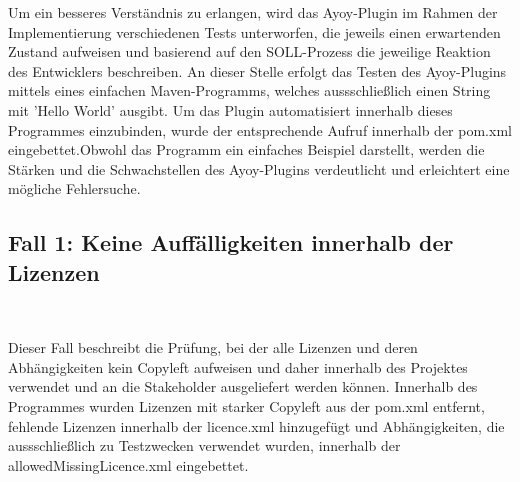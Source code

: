 Um ein besseres Verständnis zu erlangen, wird das Ayoy-Plugin im Rahmen der Implementierung verschiedenen Tests unterworfen, die jeweils einen erwartenden Zustand aufweisen und basierend auf den SOLL-Prozess die jeweilige Reaktion des Entwicklers beschreiben. An dieser Stelle erfolgt das Testen des Ayoy-Plugins mittels eines einfachen Maven-Programms, welches aussschließlich einen String mit 'Hello World' ausgibt. Um das Plugin automatisiert innerhalb dieses Programmes einzubinden, wurde der entsprechende Aufruf innerhalb der pom.xml eingebettet.Obwohl das Programm ein einfaches Beispiel darstellt, werden die Stärken und die Schwachstellen des Ayoy-Plugins verdeutlicht und erleichtert eine mögliche Fehlersuche. 

\subsection{Fall 1: Keine Auffälligkeiten innerhalb der Lizenzen}$~$

Dieser Fall beschreibt die Prüfung, bei der alle Lizenzen und deren Abhängigkeiten kein Copyleft aufweisen und daher innerhalb des Projektes verwendet und an die Stakeholder ausgeliefert werden können. Innerhalb des Programmes wurden Lizenzen mit starker Copyleft aus der pom.xml entfernt, fehlende Lizenzen innerhalb der licence.xml hinzugefügt und Abhängigkeiten, die aussschließlich zu Testzwecken verwendet wurden, innerhalb der allowedMissingLicence.xml eingebettet.  

